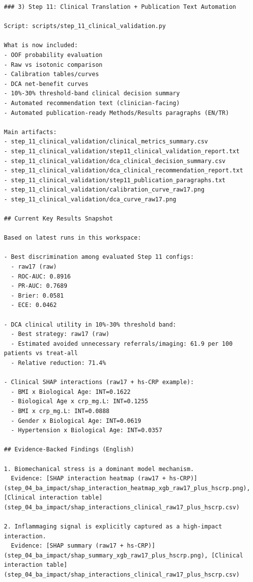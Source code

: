 ﻿\documentclass[11pt,a4paper]{article}
\begin{document}
\begin{verbatim}
### 3) Step 11: Clinical Translation + Publication Text Automation

Script: scripts/step_11_clinical_validation.py

What is now included:
- OOF probability evaluation
- Raw vs isotonic comparison
- Calibration tables/curves
- DCA net-benefit curves
- 10%-30% threshold-band clinical decision summary
- Automated recommendation text (clinician-facing)
- Automated publication-ready Methods/Results paragraphs (EN/TR)

Main artifacts:
- step_11_clinical_validation/clinical_metrics_summary.csv
- step_11_clinical_validation/step11_clinical_validation_report.txt
- step_11_clinical_validation/dca_clinical_decision_summary.csv
- step_11_clinical_validation/dca_clinical_recommendation_report.txt
- step_11_clinical_validation/step11_publication_paragraphs.txt
- step_11_clinical_validation/calibration_curve_raw17.png
- step_11_clinical_validation/dca_curve_raw17.png

## Current Key Results Snapshot

Based on latest runs in this workspace:

- Best discrimination among evaluated Step 11 configs:
  - raw17 (raw)
  - ROC-AUC: 0.8916
  - PR-AUC: 0.7689
  - Brier: 0.0581
  - ECE: 0.0462

- DCA clinical utility in 10%-30% threshold band:
  - Best strategy: raw17 (raw)
  - Estimated avoided unnecessary referrals/imaging: 61.9 per 100 patients vs treat-all
  - Relative reduction: 71.4%

- Clinical SHAP interactions (raw17 + hs-CRP example):
  - BMI x Biological Age: INT=0.1622
  - Biological Age x crp_mg.L: INT=0.1255
  - BMI x crp_mg.L: INT=0.0888
  - Gender x Biological Age: INT=0.0619
  - Hypertension x Biological Age: INT=0.0357

## Evidence-Backed Findings (English)

1. Biomechanical stress is a dominant model mechanism.
  Evidence: [SHAP interaction heatmap (raw17 + hs-CRP)](step_04_ba_impact/shap_interaction_heatmap_xgb_raw17_plus_hscrp.png), [Clinical interaction table](step_04_ba_impact/shap_interactions_clinical_raw17_plus_hscrp.csv)

2. Inflammaging signal is explicitly captured as a high-impact interaction.
  Evidence: [SHAP summary (raw17 + hs-CRP)](step_04_ba_impact/shap_summary_xgb_raw17_plus_hscrp.png), [Clinical interaction table](step_04_ba_impact/shap_interactions_clinical_raw17_plus_hscrp.csv)


\end{verbatim}
\end{document}
